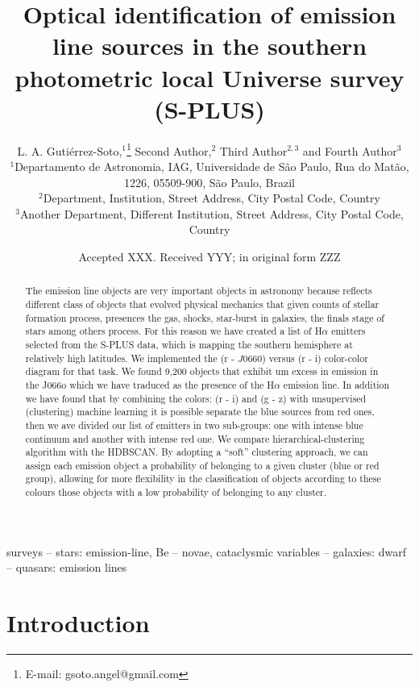 \documentclass[fleqn,usenatbib]{mnras}
\title[S-PLUS: Emission line objects]{Optical identification of emission
  line sources in the southern photometric local Universe survey (S-PLUS)}
\author[Guti\'{e}rrez-Soto et al.]{
L. A. Guti\'{e}rrez-Soto,$^{1}$\thanks{E-mail: gsoto.angel@gmail.com}
Second  Author,$^{2}$
Third Author$^{2,3}$
and Fourth Author$^{3}$
\\
$^{1}$Departamento de Astronomia, IAG, Universidade de S\~{a}o Paulo, Rua do Mat\~{a}o,
1226, 05509-900, S\~{a}o Paulo, Brazil\\
$^{2}$Department, Institution, Street Address, City Postal Code, Country\\
$^{3}$Another Department, Different Institution, Street Address, City Postal Code, Country
}
\date{Accepted XXX. Received YYY; in original form ZZZ}
\begin{document}
\label{firstpage}
\pagerange{\pageref{firstpage}--\pageref{lastpage}}
\maketitle

\begin{abstract}
  The emission line objects are very important objects in astronomy
  because reflects different class of objects that evolved physical
  mechanics that given counts of stellar formation process, presences
  the gas, shocks, star-burst in galaxies, the finals stage of stars
  among others process. For this reason we have created a list of
  H{$\alpha$} emitters selected from the S-PLUS data, which is mapping
  the southern hemisphere at relatively high latitudes. We implemented
  the (r - $J$0660) versus (r - i) color-color diagram for that task.
  We found 9,200 objects that exhibit um excess in emission in the J066o
  which we have traduced as the presence of the H{$\alpha$} emission line.
  In addition we have found that by combining the colors: (r - i) and (g - z)
  with unsupervised (clustering) machine learning it is possible separate
  the blue sources from red ones, then we ave divided our list of emitters
  in two sub-groups: one with intense blue continuum and another with
  intense red one. We compare hierarchical-clustering algorithm with the
  HDBSCAN. By adopting a ``soft'' clustering approach, we can assign
  each emission object a probability of belonging to a given cluster
  (blue or red group), allowing for more flexibility in the classification
  of objects according to these colours those objects with a low probability
  of belonging to any cluster. 
\end{abstract}
\begin{keywords}
  surveys -- stars: emission-line, Be -- novae, cataclysmic variables
  -- galaxies: dwarf -- quasars: emission lines
\end{keywords}



\section{Introduction}
\end{document}
